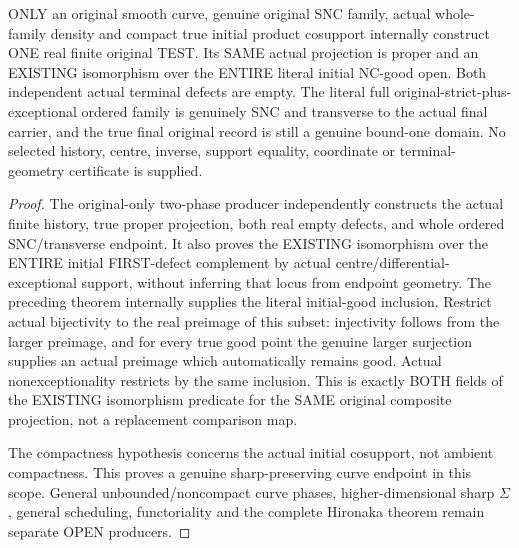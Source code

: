\begin{theorem}
\label{hir:sharp-original-curve-whole-initial-good-preserving-endpoint}
\leanok
ONLY an original smooth curve, genuine original SNC family, actual
whole-family density and compact true initial product cosupport
internally construct ONE real finite original TEST. Its SAME actual
projection is proper and an EXISTING isomorphism over the ENTIRE
literal initial NC-good open. Both independent actual terminal defects
are empty. The literal full original-strict-plus-exceptional ordered
family is genuinely SNC and transverse to the actual final carrier,
and the true final original record is still a genuine bound-one domain.
No selected history, centre, inverse, support equality, coordinate or
terminal-geometry certificate is supplied.
\end{theorem}
\begin{proof}
The original-only two-phase producer independently constructs the actual
finite history, true proper projection, both real empty defects, and
whole ordered SNC/transverse endpoint. It also proves the EXISTING
isomorphism over the ENTIRE initial FIRST-defect complement by actual
centre/differential-exceptional support, without inferring that locus
from endpoint geometry. The preceding theorem internally supplies the
literal initial-good inclusion. Restrict actual bijectivity to the real
preimage of this subset: injectivity follows from the larger preimage,
and for every true good point the genuine larger surjection supplies an
actual preimage which automatically remains good. Actual
nonexceptionality restricts by the same inclusion. This is exactly BOTH
fields of the EXISTING isomorphism predicate for the SAME original
composite projection, not a replacement comparison map.

The compactness hypothesis concerns the actual initial cosupport, not
ambient compactness. This proves a genuine sharp-preserving curve
endpoint in this scope. General unbounded/noncompact curve phases,
higher-dimensional sharp $\Sigma$, general scheduling, functoriality
and the complete Hironaka theorem remain separate OPEN producers.
\end{proof}
